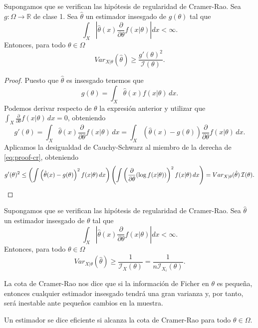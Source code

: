 \documentclass{article}
\begin{document}
    \begin{thm}
        Supongamos que se verifican las hipótesis de regularidad de Cramer-Rao. Sea $g: \Omega \to  \mathbb{R}$ de clase 1. Sea $\hat{\theta}$ un estimador insesgado de $g(\theta)$ tal que
        \[\int_X \left|\hat{\theta}(x) \frac{\partial}{\partial \theta}f(x | \theta)\right| dx < \infty.\]
        Entonces, para todo $\theta \in \Omega$
        \[Var_{X|\theta}(\hat{\theta}) \ge \frac{g'(\theta)^2}{\mathcal{I}(\theta)}.\]
    \end{thm}
    \begin{proof}
        Puesto que $\hat{\theta}$ es insesgado tenemos que
        \[g(\theta) = \int_X \hat{\theta}(x) f(x|\theta)\,dx.\]
        Podemos derivar respecto de $\theta$ la expresión anterior y utilizar que $\int_X \frac{\partial}{\partial \theta}f(x|\theta) \, dx = 0$, obteniendo
        \begin{equation}\label{eq:proof-cr}
        g'(\theta) = \int_X \hat{\theta}(x)\frac{\partial}{\partial \theta}f(x|\theta)\,dx = \int_X \left(\hat{\theta}(x) - g(\theta)\right)\frac{\partial}{\partial \theta}f(x|\theta)\,dx.
        \end{equation}
        Aplicamos la desigualdad de Cauchy-Schwarz al miembro de la derecha de \eqref{eq:proof-cr}, obteniendo
        \[g'(\theta)^2  \le \left( \int \left(\hat\theta(x) - g(\theta)\right)^2 f(x|\theta) \, dx \right) \left(\int \left( \frac{\partial}{\partial\theta} (\log f(x|\theta)) \right)^2 f(x|\theta) \, dx \right) = Var_{X|\theta}(\hat\theta) \, \mathcal{I}(\theta). \qedhere\]
    \end{proof}

    \begin{cor}
        Supongamos que se verifican las hipótesis de regularidad de Cramer-Rao. Sea $\hat{\theta}$ un estimador insesgado de $\theta$ tal que
        \[\int_X \left|\hat{\theta}(x) \frac{\partial}{\partial \theta} f(x | \theta)\right| dx < \infty.\]
        Entonces, para todo $\theta \in \Omega$
        \[Var_{X|\theta}(\hat{\theta}) \ge \frac{1}{\mathcal{I}_X(\theta)} = \frac{1}{n\mathcal{I}_{X_i}(\theta)}.\]
    \end{cor}

    La cota de Cramer-Rao nos dice que si la información de Ficher en $\theta$ es pequeña, entonces cualquier estimador insesgado tendrá una gran varianza y, por tanto, será inestable ante pequeños cambios en la muestra.

    \begin{definition}
        Un estimador se dice eficiente si alcanza la cota de Cramer-Rao para todo $\theta \in \Omega$.
    \end{definition}
\end{document}
